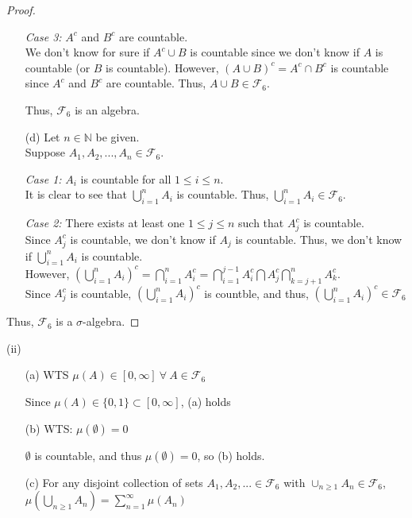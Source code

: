 \documentclass[12pt,letterpaper, onecolumn]{exam}
\newcommand{\nat}{\mathbb{N}}
\newcommand{\sigmaF}{\mathcal{F}}
\begin{document}
\begin{questions}
\begin{solution}
\begin{proof}
\begin{itemize}
        \textit{Case 3:} $A^c$ and $B^c$ are countable. \\
        We don't know for sure if $A^c \cup B$ is countable since we don't know if $A$ is countable (or $B$ is countable). However, $(A \cup B)^c = A^c \cap B^c$ is countable since $A^c$ and $B^c$ are countable. Thus, $A \cup B \in \sigmaF_6$. 
        
     Thus, $\sigmaF_6$ is an algebra.

        \item[(d)] Let $n \in \nat$ be given. \\
        Suppose $A_1, A_2, ... , A_n \in \sigmaF_6$.

        \textit{Case 1:} $A_i$ is countable for all $1 \leq i \leq n$. \\
        It is clear to see that $\bigcup_{i =1}^n A_i$ is countable. Thus, $\bigcup_{i =1}^n A_i \in \sigmaF_6$.

        \textit{Case 2:} There exists at least one $1 \leq j \leq n$ such that $A_j^c$ is countable. \\
        Since $A_j^c$ is countable, we don't know if $A_j$ is countable. Thus, we don't know if $\bigcup_{i =1}^n A_i$ is countable. \\
        However, $\left(\bigcup_{i =1}^n A_i\right)^c = \bigcap_{i =1}^n A_i^c = \bigcap_{i =1}^{j-1} A_i^c \bigcap A_j^c \bigcap_{k = j+1}^{n} A_k^c$. \\
        Since $A_j^c$ is countable, $\left(\bigcup_{i =1}^n A_i\right)^c$ is countble, and thus, $\left(\bigcup_{i =1}^n A_i\right)^c \in \sigmaF_6$
    \end{itemize}
    Thus, $\sigmaF_6$ is a $\sigma$-algebra.
    \end{proof}
    (ii) 

    \begin{enumerate}
        \item[(a)] WTS $\mu(A) \in [0, \infty] \: \forall \: A \in \sigmaF_6$

        Since $\mu(A) \in \{0, 1\} \subset [0, \infty]$, (a) holds
        \item[(b)] WTS: $\mu(\emptyset) = 0$

        $\emptyset$ is countable, and thus $\mu(\emptyset) = 0$, so (b) holds. 
        
        \item[(c)] For any disjoint collection of sets $A_1, A_2, ... \in \sigmaF_6$ with $\cup_{n \geq 1} A_n \in \sigmaF_6$, $\mu \left(\bigcup_{n \geq 1} A_n\right) = \sum_{n=1}^\infty \mu(A_n)$
        

\end{enumerate}
\end{solution}
\end{questions}
\end{document}
